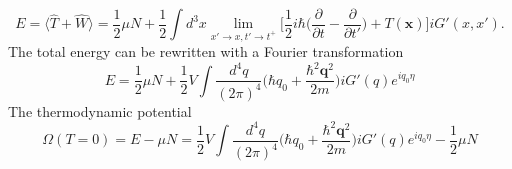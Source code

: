 \documentclass[12pt]{article}
\begin{document}
\begin{equation}
    E=\langle\hat{T}+\hat{W}\rangle=\frac{1}{2}\mu N+\frac{1}{2}\int d^3x\lim _{x'
    \rightarrow x,t'\rightarrow t^+}\Big[\frac{1}{2}i\hbar\Big(\frac{\partial}
    {\partial t}-\frac{\partial}{\partial t'}\Big)+T(\mathbf{x})\Big]iG'(x,x').
\end{equation}
The total energy can be rewritten with a Fourier transformation 
\begin{equation}\label{E}
    E=\frac{1}{2}\mu N+\frac{1}{2}V\int\frac{d^4q}{(2\pi)^4}\Big(\hbar q_0+
    \frac{\hbar^2\mathbf{q}^2}{2m}\Big)iG'(q)e^{iq_0\eta}
\end{equation}
The thermodynamic potential
\begin{equation}
    \Omega(T=0)=E-\mu N=\frac{1}{2}V\int\frac{d^4q}{(2\pi)^4}\Big(\hbar q_0+
    \frac{\hbar^2\mathbf{q}^2}{2m}\Big)iG'(q)e^{iq_0\eta}-\frac{1}{2}\mu N
\end{equation}
\end{document}
